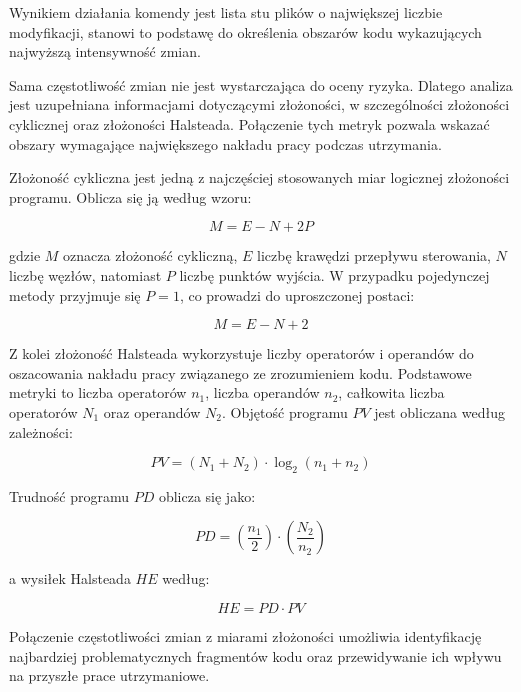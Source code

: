 Wynikiem działania komendy jest lista stu plików o największej liczbie modyfikacji, stanowi to podstawę do określenia obszarów kodu wykazujących najwyższą intensywność zmian.

Sama częstotliwość zmian nie jest wystarczająca do oceny ryzyka. Dlatego analiza jest uzupełniana informacjami dotyczącymi złożoności, w szczególności złożoności cyklicznej oraz złożoności Halsteada. Połączenie tych metryk pozwala wskazać obszary wymagające największego nakładu pracy podczas utrzymania.

Złożoność cykliczna jest jedną z najczęściej stosowanych miar logicznej złożoności programu. Oblicza się ją według wzoru:

\begin{equation}
M = E - N + 2P\label{eq:zc}
\end{equation}

gdzie \(M\) oznacza złożoność cykliczną, \(E\) liczbę krawędzi przepływu sterowania, \(N\) liczbę węzłów, natomiast \(P\) liczbę punktów wyjścia. W przypadku pojedynczej metody przyjmuje się \(P = 1\), co prowadzi do uproszczonej postaci:

\begin{equation}
M = E - N + 2\label{eq:zcp1}
\end{equation}

Z kolei złożoność Halsteada wykorzystuje liczby operatorów i operandów do oszacowania nakładu pracy związanego ze zrozumieniem kodu. Podstawowe metryki to liczba operatorów \(n_{1}\), liczba operandów \(n_{2}\), całkowita liczba operatorów \(N_{1}\) oraz operandów \(N_{2}\). Objętość programu \(PV\) jest obliczana według zależności:

\begin{equation}
PV = (N_{1} + N_{2}) \cdot \log_{2}(n_{1} + n_{2})\label{eq:pv}
\end{equation}

Trudność programu \(PD\) oblicza się jako:

\begin{equation}
PD = \left(\frac{n_{1}}{2}\right) \cdot \left(\frac{N_{2}}{n_{2}}\right)\label{eq:pd}
\end{equation}

a wysiłek Halsteada \(HE\) według:

\begin{equation}
HE = PD \cdot PV\label{eq:he}
\end{equation}

Połączenie częstotliwości zmian z miarami złożoności umożliwia identyfikację najbardziej problematycznych fragmentów kodu oraz przewidywanie ich wpływu na przyszłe prace utrzymaniowe.

